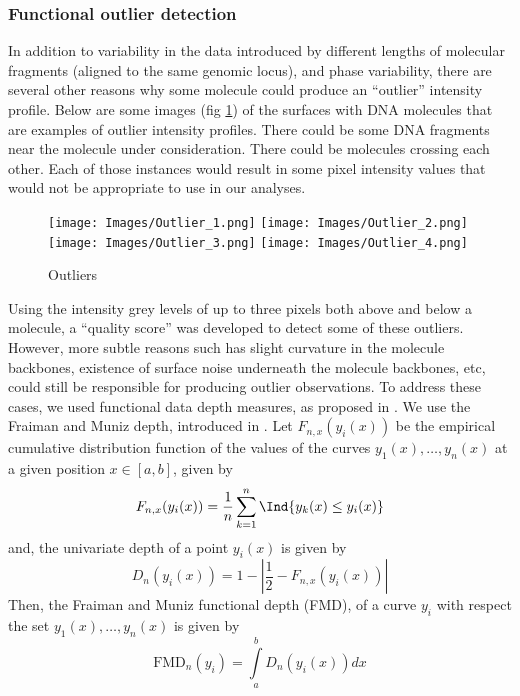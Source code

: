 \subsubsection{Functional outlier detection} \label{ch3_outlier}
In addition to variability in the data introduced by different lengths of molecular fragments (aligned to the same genomic locus), and phase variability, there are several other reasons why some molecule could produce an ``outlier'' intensity profile. Below are some images (fig \ref{fig:Fig3_OutlierImages}) of the surfaces with DNA molecules that are examples of outlier intensity profiles. There could be some DNA fragments near the molecule under consideration. There could be molecules crossing each other. Each of those instances would result in some pixel intensity values that would not be appropriate to use in our analyses. 
\begin{figure}[H]
\begin{center}
\texttt{[image: Images/Outlier\_1.png]}
\texttt{[image: Images/Outlier\_2.png]}
\texttt{[image: Images/Outlier\_3.png]}
\texttt{[image: Images/Outlier\_4.png]}
\end{center}
\caption{Outliers}
\label{fig:Fig3_OutlierImages}
\end{figure}
Using the intensity grey levels of up to three pixels both above and below a molecule, a ``quality score'' was developed to detect some of these outliers. However, more subtle reasons such has slight curvature in the molecule backbones, existence of surface noise underneath the molecule backbones, etc, could still be responsible for producing outlier observations. To address these cases, we used functional data depth measures, as proposed in \cite{Febrero-Bande_etal_2007_Environmetrics}. We use the Fraiman and Muniz depth, introduced in \cite{Fraiman_Muniz_2001_SEIO}. Let $F_{n,x} (y_i (x))$ be the empirical cumulative distribution function of the values of the curves $y_1(x), \dots , y_n(x)$ at a given position $x \in [a, b]$, given by
\[ F_{n,x} (y_i (x)) = \frac{1}{n}\sum\limits_{k=1}^{n} \Ind\{ y_k(x) \leq y_i(x)\}\]
and, the univariate depth of a point $y_i(x)$ is given by
\[ D_n(y_i(x)) = 1 - \left| \frac{1}{2} - F_{n,x} (y_i (x)) \right| \]
Then, the Fraiman and Muniz functional depth (FMD), of a curve $y_i$ with respect the set $y_1(x), \dots , y_n(x)$ is given by 
\begin{equation}
\text{FMD}_n(y_i) = \int\limits_a^b D_n(y_i(x)) dx
\label{eq:3_depth}
\end{equation}
